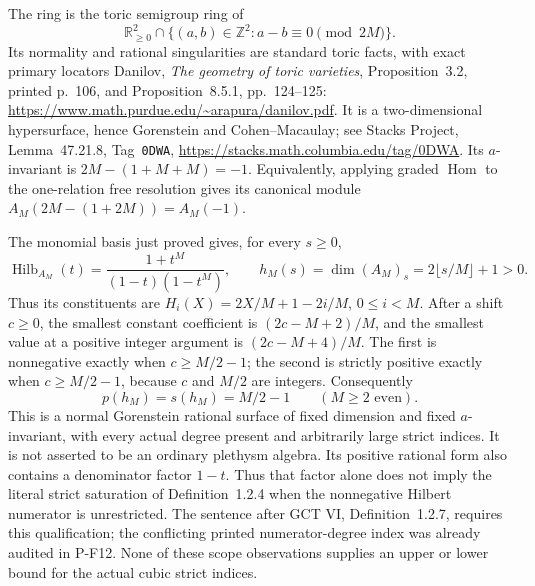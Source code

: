 The ring is the toric semigroup ring of
\[
 \mathbb R_{\ge0}^2\cap
   \{(a,b)\in\mathbb Z^2:a-b\equiv0\pmod {2M}\}.
\]
Its normality and rational singularities are standard toric
facts, with exact primary locators Danilov,
\emph{The geometry of toric varieties}, Proposition~3.2,
printed p.~106, and Proposition~8.5.1, pp.~124--125:
\url{https://www.math.purdue.edu/~arapura/danilov.pdf}.
It is a two-dimensional hypersurface, hence Gorenstein
and Cohen--Macaulay; see Stacks Project,
Lemma~47.21.8, Tag~\texttt{0DWA},
\url{https://stacks.math.columbia.edu/tag/0DWA}.
Its $a$-invariant is $2M-(1+M+M)=-1$.
Equivalently, applying graded $\operatorname{Hom}$ to the
one-relation free resolution gives its canonical module
$A_M(2M-(1+2M))=A_M(-1)$.

The monomial basis just proved gives, for every $s\ge0$,
\[
 \operatorname{Hilb}_{A_M}(t)
    =\frac{1+t^M}{(1-t)(1-t^M)},\qquad
 h_M(s)=\dim(A_M)_s=2\lfloor s/M\rfloor+1>0.              \tag{P-F54w}
\]
Thus its constituents are
$H_i(X)=2X/M+1-2i/M$, $0\le i<M$.
After a shift $c\ge0$, the smallest constant coefficient
is $(2c-M+2)/M$, and the smallest value at a positive
integer argument is $(2c-M+4)/M$.
The first is nonnegative exactly when $c\ge M/2-1$;
the second is strictly positive exactly when $c\ge M/2-1$,
because $c$ and $M/2$ are integers. Consequently
\[
             p(h_M)=s(h_M)=M/2-1 \qquad(M\ge2\text{ even}).
                                                               \tag{P-F54x}
\]
This is a normal Gorenstein rational surface of fixed
dimension and fixed $a$-invariant, with every actual degree
present and arbitrarily large strict indices. It is not
asserted to be an ordinary plethysm algebra.
Its positive rational form also contains a denominator
factor $1-t$. Thus that factor alone does not imply the
literal strict saturation of Definition~1.2.4 when the
nonnegative Hilbert numerator is unrestricted. The sentence
after GCT VI, Definition~1.2.7, requires this qualification;
the conflicting printed numerator-degree index was already
audited in P-F12. None of these scope observations supplies
an upper or lower bound for the actual cubic strict indices.

